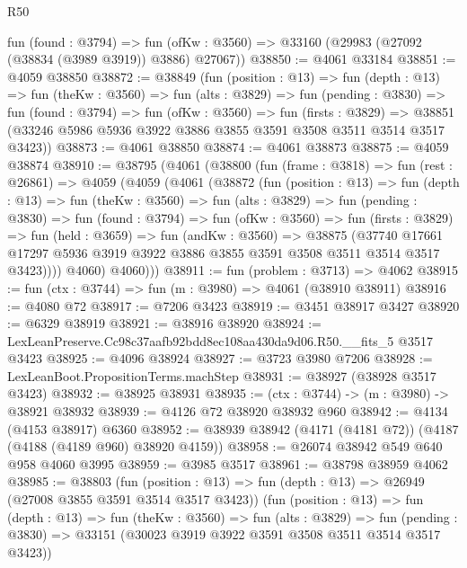 \begin{lexlean}{R50}
\begin{coremodule}
    fun (found : @3794) =>
    fun (ofKw : @3560) => @33160 (@29983 (@27092 (@38834 (@3989 @3919)) @3886) @27067))
@38850 := @4061 @33184
@38851 := @4059 @38850
@38872 := @38849
    (fun (position : @13) =>
    fun (depth : @13) =>
    fun (theKw : @3560) =>
    fun (alts : @3829) =>
    fun (pending : @3830) =>
    fun (found : @3794) =>
    fun (ofKw : @3560) =>
    fun (firsts : @3829) =>
    @38851 (@33246 @5986 @5936 @3922 @3886 @3855 @3591 @3508 @3511 @3514 @3517 @3423))
@38873 := @4061 @38850
@38874 := @4061 @38873
@38875 := @4059 @38874
@38910 := @38795
    (@4061
      (@38800
        (fun (frame : @3818) =>
        fun (rest : @26861) =>
        @4059
          (@4059
            (@4061
              (@38872
                (fun (position : @13) =>
                fun (depth : @13) =>
                fun (theKw : @3560) =>
                fun (alts : @3829) =>
                fun (pending : @3830) =>
                fun (found : @3794) =>
                fun (ofKw : @3560) =>
                fun (firsts : @3829) =>
                fun (held : @3659) =>
                fun (andKw : @3560) =>
                @38875
                  (@37740
                    @17661
                    @17297
                    @5936
                    @3919
                    @3922
                    @3886
                    @3855
                    @3591
                    @3508
                    @3511
                    @3514
                    @3517
                    @3423))))
            @4060)
          @4060)))
@38911 := fun (problem : @3713) => @4062
@38915 := fun (ctx : @3744) => fun (m : @3980) => @4061 (@38910 @38911)
@38916 := @4080 @72
@38917 := @7206 @3423
@38919 := @3451 @38917 @3427
@38920 := @6329 @38919
@38921 := @38916 @38920
@38924 := LexLeanPreserve.Cc98c37aafb92bdd8ec108aa430da9d06.R50.__fits_5 @3517 @3423
@38925 := @4096 @38924
@38927 := @3723 @3980 @7206
@38928 := LexLeanBoot.PropositionTerms.machStep
@38931 := @38927 (@38928 @3517 @3423)
@38932 := @38925 @38931
@38935 := (ctx : @3744) -> (m : @3980) -> @38921 @38932
@38939 := @4126 @72 @38920 @38932 @960
@38942 := @4134 (@4153 @38917) @6360
@38952 := @38939 @38942 (@4171 (@4181 @72)) (@4187 (@4188 (@4189 @960) @38920 @4159))
@38958 := @26074 @38942 @549 @640 @958 @4060 @3995
@38959 := @3985 @3517
@38961 := @38798 @38959 @4062
@38985 := @38803
    (fun (position : @13) => fun (depth : @13) => @26949 (@27008 @3855 @3591 @3514 @3517 @3423))
    (fun (position : @13) =>
    fun (depth : @13) =>
    fun (theKw : @3560) =>
    fun (alts : @3829) =>
    fun (pending : @3830) => @33151 (@30023 @3919 @3922 @3591 @3508 @3511 @3514 @3517 @3423))

\end{coremodule}
\end{lexlean}
